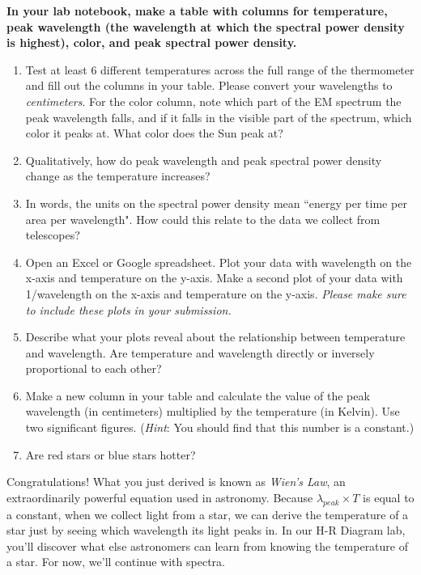 \documentclass[11pt]{article}
\begin{document}
\medskip \noindent
\textbf{In your lab notebook, make a table with columns for temperature, peak wavelength (the wavelength at which the spectral power density is highest), color, and peak spectral power density.}
\begin{enumerate}
    \item Test at least 6 different temperatures across the full range of the thermometer and fill out the columns in your table.  Please convert your wavelengths to \textit{centimeters}.  For the color column, note which part of the EM spectrum the peak wavelength falls, and if it falls in the visible part of the spectrum, which color it peaks at.  What color does the Sun peak at?
    \item Qualitatively, how do peak wavelength and peak spectral power density change as the temperature increases?
    \item In words, the units on the spectral power density mean ``energy per time per area per wavelength".  How could this relate to the data we collect from telescopes?
    \item Open an Excel or Google spreadsheet. Plot your data with wavelength on the x-axis and temperature on the y-axis.  Make a second plot of your data with 1/wavelength on the x-axis and temperature on the y-axis. \textit{Please make sure to include these plots in your submission.}
    \item Describe what your plots reveal about the relationship between temperature and wavelength.  Are temperature and wavelength directly or inversely proportional to each other?
    \item Make a new column in your table and calculate the value of the peak wavelength (in centimeters) multiplied by the temperature (in Kelvin). Use two significant figures. (\textit{Hint}: You should find that this number is a constant.)
    \item Are red stars or blue stars hotter?
\end{enumerate}

\medskip \noindent
Congratulations! What you just derived is known as \textit{Wien's Law}, an extraordinarily powerful equation used in astronomy. Because $\lambda_{peak} \times T$ is equal to a constant, when we collect light from a star, we can derive the temperature of a star just by seeing which wavelength its light peaks in. In our H-R Diagram lab, you'll discover what else astronomers can learn from knowing the temperature of a star. For now, we'll continue with spectra.
\end{document}
